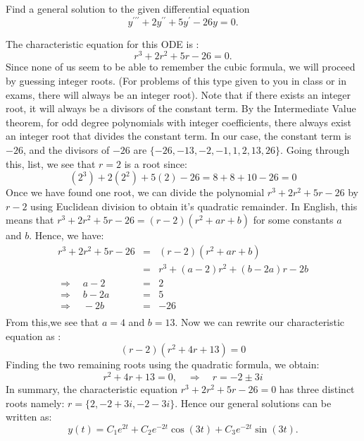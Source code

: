 \documentclass[11pt]{article}
\begin{document}
\begin{problem}
Find a general solution to the given differential equation
\begin{equation*}
y^{\prime \prime \prime}+2y^{\prime \prime} + 5 y^{\prime} -26 y =0.
\end{equation*}
\end{problem}
\begin{solution}
The characteristic equation for this ODE is :
\begin{equation*}
r^3+2r^2+5r-26=0.
\end{equation*}
Since none of us seem to be able to remember the cubic formula, we will proceed by guessing integer roots. (For problems of this type given to you in class or in exams, there will always be an integer root). Note that if there exists an integer root, it will always be a divisors of the constant term. By the Intermediate Value theorem, for odd degree polynomials with integer coefficients, there always exist an integer root that divides the constant term.
In our case, the constant term is $-26$, and the divisors of $-26$ are $ \{-26,-13,-2,-1,1,2,13,26 \}$.
Going through this, list, we see that $r=2$ is a root since:
\begin{equation*}
(2^3)+2 (2^2)+5(2)-26 = 8 + 8 +10 -26 =0
\end{equation*}
Once we have found one root, we can divide the polynomial $r^3+2r^2+5r-26$ by $r-2$ using Euclidean division to obtain it's quadratic remainder. In English, this means that $r^3+2r^2+5r-26= (r-2)(r^2+ar+b)$ for some constants $a$ and $b$.
Hence, we have:
\begin{eqnarray*}
r^3+2r^2+5r-26 & = & (r-2)(r^2+ar+b) \\
& = & r^3 +(a-2)r^2 + (b-2a)r-2b\\
\Rightarrow \quad a-2 & = & 2 \\
\Rightarrow \quad b-2a & = & 5\\
\Rightarrow \quad -2b & = & -26\\
\end{eqnarray*}
From this,we see that $a=4$ and $b=13$.
Now we can rewrite our characteristic equation as :
\begin{equation*}
(r-2)(r^2+4r+13)=0
\end{equation*}
Finding the two remaining roots using the quadratic formula, we obtain:
\begin{equation*}
r^2+4r+13=0, \quad \Rightarrow \quad r = -2 \pm 3 i
\end{equation*}
In summary, the characteristic equation $r^3+2r^2+5r-26=0$ has three distinct roots namely: $r = \{2, -2 + 3i, -2 -3i\}$. Hence our general solutions can be written as:
\begin{equation*}
\boxed{ y(t) = C_{1} e^{2t} + C_{2} e^{-2t} \cos(3t) + C_{3} e^{-2t} \sin(3t)}.
\end{equation*}
\end{solution}
\end{document}
